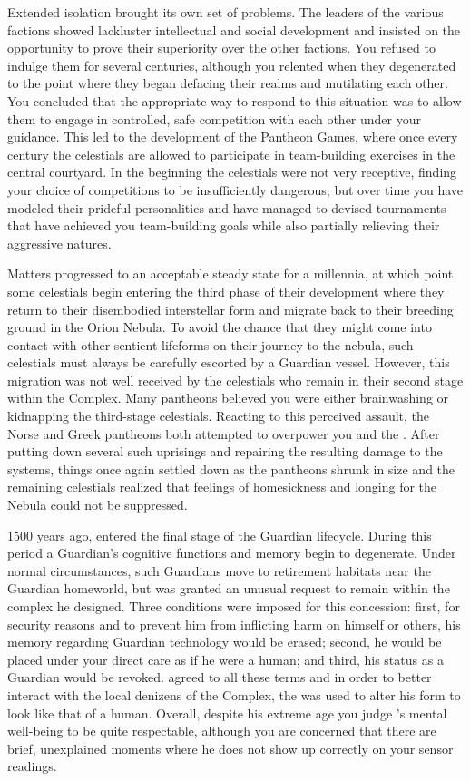 \documentclass[char]{guardians}
\begin{document}
Extended isolation brought its own set of problems. The leaders of the various factions showed lackluster intellectual and social development and insisted on the opportunity to prove their superiority over the other factions. You refused to indulge them for several centuries, although you relented when they degenerated to the point where they began defacing their realms and mutilating each other. You concluded that the appropriate way to respond to this situation was to allow them to engage in controlled, safe competition with each other under your guidance. This led to the development of the Pantheon Games, where once every century the celestials are allowed to participate in team-building exercises in the central courtyard. In the beginning the celestials were not very receptive, finding your choice of competitions to be insufficiently dangerous, but over time you have modeled their prideful personalities and have managed to devised tournaments that have achieved you team-building goals while also partially relieving their aggressive natures.

Matters progressed to an acceptable steady state for a millennia, at which point some celestials begin entering the third phase of their development where they return to their disembodied interstellar form and migrate back to their breeding ground in the Orion Nebula. To avoid the chance that they might come into contact with other sentient lifeforms on their journey to the nebula, such celestials must always be carefully escorted by a Guardian vessel. However, this migration was not well received by the celestials who remain in their second stage within the Complex. Many pantheons believed you were either brainwashing or kidnapping the third-stage celestials. Reacting to this perceived assault, the Norse and Greek pantheons both attempted to overpower you and the \cWarden{}. After putting down several such uprisings and repairing the resulting damage to the systems, things once again settled down as the pantheons shrunk in size and the remaining celestials realized that feelings of homesickness and longing for the Nebula could not be suppressed.

1500 years ago, \cJascha{} entered the final stage of the Guardian lifecycle. During this period a Guardian's cognitive functions and memory begin to degenerate. Under normal circumstances, such Guardians move to retirement habitats near the Guardian homeworld, but \cJascha{} was granted an unusual request to remain within the complex he designed. Three conditions were imposed for this concession: first, for security reasons and to prevent him from inflicting harm on himself or others, his memory regarding Guardian technology would be erased; second, he would be placed under your direct care as if he were a human; and third, his status as a Guardian would be revoked. \cJascha{} agreed to all these terms and in order to better interact with the local denizens of the Complex, the \assembler{} was used to alter his form to look like that of a human. Overall, despite his extreme age you judge \cJascha{}'s mental well-being to be quite respectable, although you are concerned that there are brief, unexplained moments where he does not show up correctly on your sensor readings.
\end{document}
